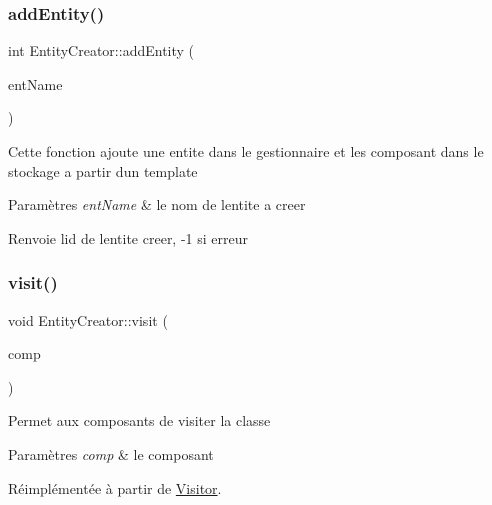 \subsubsection{\texorpdfstring{add\+Entity()}{addEntity()}}
{\footnotesize\ttfamily int Entity\+Creator\+::add\+Entity (\begin{DoxyParamCaption}\item[{const std\+::string \&}]{ent\+Name }\end{DoxyParamCaption})}

Cette fonction ajoute une entite dans le gestionnaire et les composant dans le stockage a partir d\textquotesingle{}un template


\begin{DoxyParams}{Paramètres}
{\em ent\+Name} & le nom de l\textquotesingle{}entite a creer \\
\hline
\end{DoxyParams}
\begin{DoxyReturn}{Renvoie}
l\textquotesingle{}id de l\textquotesingle{}entite creer, -\/1 si erreur 
\end{DoxyReturn}
\mbox{\label{classEntityCreator_ae6e6fa03f354303f33714c875bda0c62}} 
\subsubsection{\texorpdfstring{visit()}{visit()}\hspace{0.1cm}{\footnotesize\ttfamily [1/5]}}
{\footnotesize\ttfamily void Entity\+Creator\+::visit (\begin{DoxyParamCaption}\item[{\hyperlink{structPositionComponent}{Position\+Component} \&}]{comp }\end{DoxyParamCaption})\hspace{0.3cm}{\ttfamily [virtual]}}

Permet aux composants de visiter la classe


\begin{DoxyParams}{Paramètres}
{\em comp} & le composant \\
\hline
\end{DoxyParams}


Réimplémentée à partir de \hyperlink{classVisitor_afc865e84cb1293284e6f524a00049b11}{Visitor}.

\mbox{\label{classEntityCreator_aaa96ee2442660da23e34a1f0cec3fa47}} 
